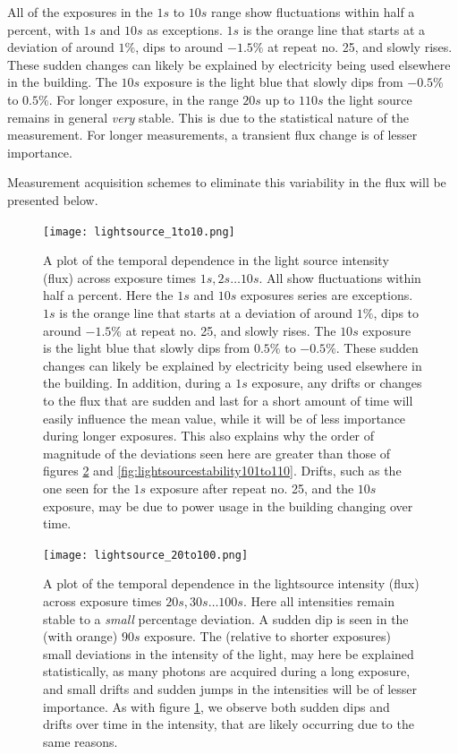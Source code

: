 \documentclass[../main.tex]{subfiles}
\begin{document}
		All of the exposures in the $1s$ to $10s$ range show fluctuations within half a percent, with $1s$ and $10s$ as exceptions. $1s$ is the orange line that starts at a deviation of around $1\%$, dips to around $-1.5\%$ at repeat no. 25, and slowly rises. These sudden changes can likely be explained by electricity being used elsewhere in the building. The $10s$ exposure is the light blue that slowly dips from $-0.5\%$ to $0.5\%$. For longer exposure, in the range $20s$ up to $110s$ the light source remains in general \textit{very} stable. This is due to the statistical nature of the measurement. For longer measurements, a transient flux change is of lesser importance.
		
		Measurement acquisition schemes to eliminate this variability in the flux will be presented below. 
		
		\begin{figure}
			\centering			\texttt{[image: lightsource\_1to10.png]}
			\caption{A plot of the temporal dependence in the light source intensity (flux) across exposure times $1s, 2s \dots 10s$. All show fluctuations within half a percent. Here the $1s$ and $10s$ exposures series are exceptions. $1s$ is the orange line that starts at a deviation of around $1\%$, dips to around $-1.5\%$ at repeat no. 25, and slowly rises. The $10s$ exposure is the light blue that slowly dips from $0.5\%$ to $-0.5\%$. These sudden changes can likely be explained by electricity being used elsewhere in the building. In addition, during a $1s$ exposure, any drifts or changes to the flux that are sudden and last for a short amount of time will easily influence the mean value, while it will be of less importance during longer exposures. This also explains why the order of magnitude of the deviations seen here are greater than those of figures \ref{fig:lightsourcestability20to100} and \ref{fig:lightsourcestability101to110}. Drifts, such as the one seen for the $1s$ exposure after repeat no. 25, and the $10s$ exposure, may be due to power usage in the building changing over time. }
			\label{fig:lightsourcestability1to10}
		\end{figure}
		\begin{figure}
			\centering			\texttt{[image: lightsource\_20to100.png]}
			\caption{A plot of the temporal dependence in the lightsource intensity (flux) across exposure times $20s, 30s \dots 100s$. Here all intensities remain stable to a \textit{small} percentage deviation. A sudden dip is seen in the (with orange) $90s$ exposure. The (relative to shorter exposures) small deviations in the intensity of the light, may here be explained statistically, as many photons are acquired during a long exposure, and small drifts and sudden jumps in the intensities will be of lesser importance. As with figure \ref{fig:lightsourcestability1to10}, we observe both sudden dips and drifts over time in the intensity, that are likely occurring due to the same reasons.}
			\label{fig:lightsourcestability20to100}
		\end{figure}
\end{document}
